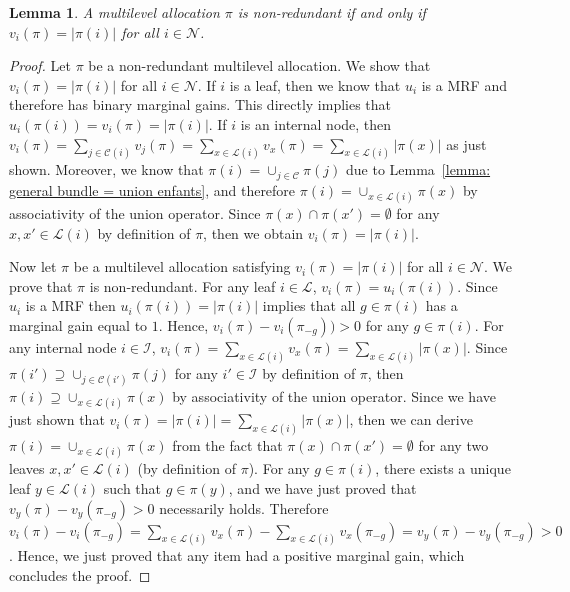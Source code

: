 \documentclass[]{article}
\newtheorem{lemma}{Lemma}
\newcommand{\nodes}{\mathcal{N}}
\newcommand{\children}{\mathcal{C}}
\newcommand{\leaves}{\mathcal{L}}
\newcommand{\internal}{\mathcal{I}}
\begin{document}
\begin{lemma} \label{lemma: multilevel non-redundancy}
 A multilevel allocation $\pi$ is non-redundant if and only if $v_i(\pi)= |\pi(i)| $ for all $i\in \nodes$.
\end{lemma}

\begin{proof} Let $\pi$ be a non-redundant multilevel allocation. We show that $v_i(\pi) = |\pi(i)|$ for all $i \in \nodes$. If $i$ is a leaf, then we know that $u_i$ is a MRF and therefore has binary marginal gains. This directly implies  that $u_i(\pi(i))=v_i(\pi)= |\pi(i)|$. If $i$ is an internal node, then $v_i(\pi)=\sum_{j \in \children(i)} v_j(\pi) = \sum_{x \in \leaves(i)} v_x(\pi) = \sum_{x \in \leaves(i)} |\pi(x)|$ as just shown. Moreover, we know that $\pi(i) = \cup_{j \in \children} \pi(j)$ due to Lemma~\ref{lemma: general bundle = union enfants}, and therefore $\pi(i) = \cup_{x \in \leaves(i)} \pi(x)$ by associativity of the union operator. Since $\pi(x) \cap \pi(x') = \emptyset$ for any $x,x' \in \leaves(i)$ by definition of $\pi$, then we obtain $v_i(\pi)=|\pi(i)|$. 

Now let $\pi$ be a multilevel allocation satisfying $v_i(\pi)= |\pi(i)| $ for all $i\in \nodes$. We prove that $\pi$ is non-redundant. For any leaf $i \in \leaves$, $v_i(\pi) = u_i(\pi(i))$. Since $u_i$ is a MRF then $u_i(\pi(i)) = |\pi(i)|$ implies that all $g \in \pi(i)$ has a marginal gain equal to $1$. Hence, $v_i(\pi) - v_i(\pi_{-g})) > 0$ for any $g \in \pi(i)$. For any internal node $i \in \internal$,  $v_i(\pi)=\sum_{x \in \leaves(i)} v_x(\pi) = \sum_{x \in \leaves(i)} |\pi(x)|$. Since $\pi(i') \supseteq \cup_{j \in \children(i')} \pi(j)$ for any $i' \in \internal$ by definition of $\pi$, then $\pi(i) \supseteq \cup_{x \in \leaves(i)} \pi(x)$ by associativity of the union operator. Since we have just shown that $v_i(\pi)= |\pi(i)| =  \sum_{x \in \leaves(i)} |\pi(x)|$, then we can derive $\pi(i) = \cup_{x \in \leaves(i)} \pi(x)$ from the fact that $\pi(x) \cap \pi(x') = \emptyset$ for any two leaves $x,x' \in \leaves(i)$ (by definition of $\pi$). For any $g \in \pi(i)$, there exists a unique leaf $y \in \leaves(i)$ such that $g \in \pi(y)$, and we have just proved that $v_y(\pi) - v_y(\pi_{-g}) > 0$ necessarily holds. Therefore $v_i(\pi) - v_i(\pi_{-g}) = \sum_{x \in \leaves(i)} v_x(\pi) - \sum_{x \in \leaves(i)} v_x(\pi_{-g}) = v_y(\pi) - v_y(\pi_{-g}) > 0$. Hence, we just proved that any item had a positive marginal gain, which concludes the proof.
\end{proof}
\end{document}
